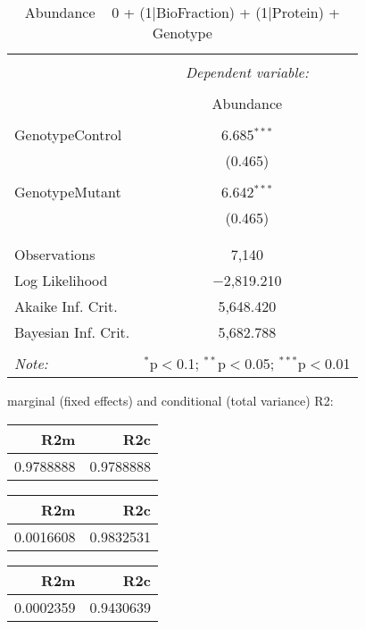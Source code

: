 \documentclass[11pt]{report}
\begin{document}
\begin{table}[!htbp] \centering 
  \caption{Abundance ~ 0 + (1|BioFraction) + (1|Protein) + Genotype} 
  \label{} 
\begin{tabular}{@{\extracolsep{5pt}}lc} 
\\[-1.8ex]\hline 
\hline \\[-1.8ex] 
 & \multicolumn{1}{c}{\textit{Dependent variable:}} \\ 
\cline{2-2} 
\\[-1.8ex] & Abundance \\ 
\hline \\[-1.8ex] 
 GenotypeControl & 6.685$^{***}$ \\ 
  & (0.465) \\ 
  & \\ 
 GenotypeMutant & 6.642$^{***}$ \\ 
  & (0.465) \\ 
  & \\ 
\hline \\[-1.8ex] 
Observations & 7,140 \\ 
Log Likelihood & $-$2,819.210 \\ 
Akaike Inf. Crit. & 5,648.420 \\ 
Bayesian Inf. Crit. & 5,682.788 \\ 
\hline 
\hline \\[-1.8ex] 
\textit{Note:}  & \multicolumn{1}{r}{$^{*}$p$<$0.1; $^{**}$p$<$0.05; $^{***}$p$<$0.01} \\ 
\end{tabular} 
\end{table} 
marginal (fixed effects) and conditional (total variance) R2:

\begin{tabular}{r|r}
\hline
R2m & R2c\\
\hline
0.9788888 & 0.9788888\\
\hline
\end{tabular}

\begin{tabular}{r|r}
\hline
R2m & R2c\\
\hline
0.0016608 & 0.9832531\\
\hline
\end{tabular}

\begin{tabular}{r|r}
\hline
R2m & R2c\\
\hline
0.0002359 & 0.9430639\\
\hline
\end{tabular}
\end{document}
